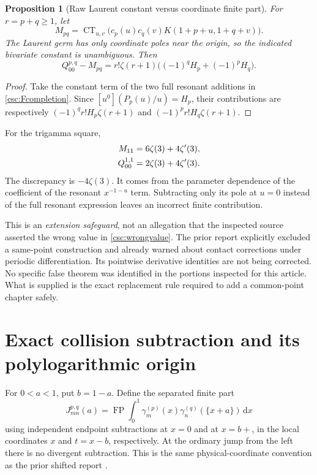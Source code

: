 \documentclass[11pt,a4paper]{article}
\numberwithin{equation}{section}
\newtheorem{proposition}[theorem]{Proposition}
\theoremstyle{definition}
\newcommand{\dd}{\,\mathrm dx}
\newcommand{\FP}{\operatorname{FP}}
\newcommand{\CT}{\operatorname{CT}}
\begin{document}
\begin{proposition}[Raw Laurent constant versus coordinate finite part]\label{csc:rawCT}
For $r=p+q\ge1$, let
\[
M_{pq}=\CT_{u,v}\big(c_p(u)c_q(v)K(1+p+u,1+q+v)\big).
\]
The Laurent germ has only coordinate poles near the origin, so the indicated bivariate constant is unambiguous. Then
\begin{equation}\label{csc:CTcorrection}
Q_{00}^{p,q}-M_{pq}
=r!\zeta(r+1)\big((-1)^qH_p+(-1)^pH_q\big).
\end{equation}
\end{proposition}
\begin{proof}
Take the constant term of the two full resonant additions in \eqref{csc:Fcompletion}. Since $[u^0](P_p(u)/u)=H_p$, their contributions are respectively $(-1)^qr!H_p\zeta(r+1)$ and $(-1)^pr!H_q\zeta(r+1)$.
\end{proof}
For the trigamma square,
\begin{align}
M_{11}&=6\zeta(3)+4\zeta'(3),\label{csc:wrongvalue}\\
Q_{00}^{1,1}&=2\zeta(3)+4\zeta'(3).\notag
\end{align}
The discrepancy is $-4\zeta(3)$. It comes from the parameter dependence of the coefficient of the resonant $x^{-1-u}$ term. Subtracting only its pole at $u=0$ instead of the full resonant expression leaves an incorrect finite contribution.

This is an \emph{extension safeguard}, not an allegation that the inspected source asserted the wrong value in \eqref{csc:wrongvalue}. The prior report explicitly excluded a same-point construction and already warned about contact corrections under periodic differentiation. Its pointwise derivative identities are not being corrected. No specific false theorem was identified in the portions inspected for this article. What is supplied is the exact replacement rule required to add a common-point chapter safely.

\section{Exact collision subtraction and its polylogarithmic origin}\label{csc:collision-section}
For $0<a<1$, put $b=1-a$. Define the separated finite part
\begin{equation}\label{csc:Jdef}
J_{mn}^{p,q}(a)=\FP\int_0^1
\gamma_m^{(p)}(x)\gamma_n^{(q)}(\{x+a\})\dd
\end{equation}
using independent endpoint subtractions at $x=0$ and at $x=b+$, in the local coordinates $x$ and $t=x-b$, respectively. At the ordinary jump from the left there is no divergent subtraction. This is the same physical-coordinate convention as the prior shifted report \cite{csc:shifted}.
\end{document}
